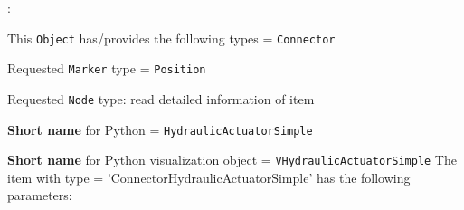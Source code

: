 \noindent {}:
\bi
  \item This \texttt{Object} has/provides the following types = \texttt{Connector}
  \item Requested \texttt{Marker} type = \texttt{Position}
  \item Requested \texttt{Node} type: read detailed information of item
  \item {\bf Short name} for Python = \texttt{HydraulicActuatorSimple}
  \item {\bf Short name} for Python visualization object = \texttt{VHydraulicActuatorSimple}
\ei\vspace{12pt} \noindent 
The item  with type = 'ConnectorHydraulicActuatorSimple' has the following parameters:
\vspace{-0.5cm}\\
\vspace{-0.5cm}\\
